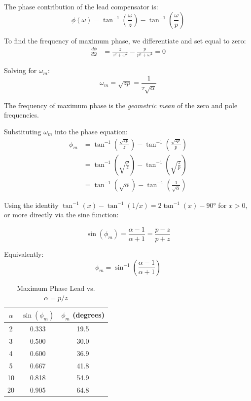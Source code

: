 The phase contribution of the lead compensator is:
\begin{equation}
\phi(\omega) = \tan^{-1}\left(\frac{\omega}{z}\right) - \tan^{-1}\left(\frac{\omega}{p}\right)
\label{eq:lead_phase}
\end{equation}

To find the frequency of maximum phase, we differentiate and set equal to zero:
\begin{align}
\frac{d\phi}{d\omega} &= \frac{z}{z^2 + \omega^2} - \frac{p}{p^2 + \omega^2} = 0
\end{align}

Solving for $\omega_m$:
\begin{equation}
\boxed{\omega_m = \sqrt{zp} = \frac{1}{\tau\sqrt{\alpha}}}
\label{eq:omega_max}
\end{equation}

The frequency of maximum phase is the \textit{geometric mean} of the zero and pole frequencies.

Substituting $\omega_m$ into the phase equation:
\begin{align}
\phi_m &= \tan^{-1}\left(\frac{\sqrt{zp}}{z}\right) - \tan^{-1}\left(\frac{\sqrt{zp}}{p}\right) \\
&= \tan^{-1}\left(\sqrt{\frac{p}{z}}\right) - \tan^{-1}\left(\sqrt{\frac{z}{p}}\right) \\
&= \tan^{-1}(\sqrt{\alpha}) - \tan^{-1}\left(\frac{1}{\sqrt{\alpha}}\right)
\end{align}

Using the identity $\tan^{-1}(x) - \tan^{-1}(1/x) = 2\tan^{-1}(x) - 90°$ for $x > 0$, or more directly via the sine function:

\begin{equation}
\boxed{\sin(\phi_m) = \frac{\alpha - 1}{\alpha + 1} = \frac{p - z}{p + z}}
\label{eq:phi_max}
\end{equation}

Equivalently:
\begin{equation}
\phi_m = \sin^{-1}\left(\frac{\alpha - 1}{\alpha + 1}\right)
\label{eq:phi_max_explicit}
\end{equation}

\begin{table}[htbp]
\centering
\caption{Maximum Phase Lead vs. $\alpha = p/z$}
\label{tab:alpha_phase}
\begin{tabular}{ccc}
\toprule
$\alpha$ & $\sin(\phi_m)$ & $\phi_m$ (degrees) \\
\midrule
2 & 0.333 & 19.5 \\
3 & 0.500 & 30.0 \\
4 & 0.600 & 36.9 \\
5 & 0.667 & 41.8 \\
10 & 0.818 & 54.9 \\
20 & 0.905 & 64.8 \\
\bottomrule
\end{tabular}
\end{table}

